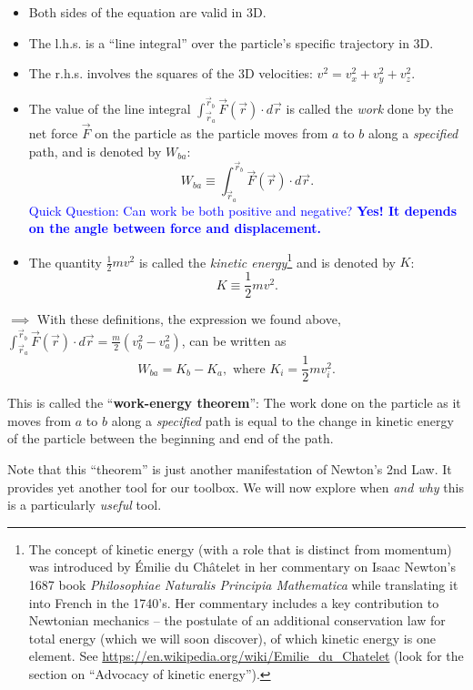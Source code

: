 \documentclass[11pt, letterpaper, openany]{book}
\begin{document}
\begin{itemize}
    \item Both sides of the equation are valid in 3D.
    \item The l.h.s. is a ``line integral'' over the particle's specific trajectory in 3D.
    \item The r.h.s. involves the squares of the 3D velocities: $v^2 = v_x^2 + v_y^2 + v_z^2$.
    \item The value of the line integral $\int_{\vec{r}_a}^{\vec{r}_b} \vec{F}(\vec{r}) \cdot d\vec{r}$ is called the \textit{work} done by the net force $\vec{F}$ on the particle as the particle moves from $a$ to $b$ along a \textit{specified} path, and is denoted by $W_{ba}$:
    \[ W_{ba} \equiv \int_{\vec{r}_a}^{\vec{r}_b} \vec{F}(\vec{r}) \cdot d\vec{r}. \]
    \textcolor{blue}{Quick Question: Can work be both positive and negative? \textbf{Yes! It depends on the angle between force and displacement.}}
    \item The quantity $\frac{1}{2}mv^2$ is called the \textit{kinetic energy}\footnote{The concept of kinetic energy (with a role that is distinct from momentum) was introduced by \'Emilie du Ch\^atelet in her commentary on Isaac Newton's 1687 book \textit{Philosophiae Naturalis Principia Mathematica} while translating it into French in the 1740's. Her commentary includes a key contribution to Newtonian mechanics -- the postulate of an additional conservation law for total energy (which we will soon discover), of which kinetic energy is one element. See \url{https://en.wikipedia.org/wiki/Emilie_du_Chatelet} (look for the section on ``Advocacy of kinetic energy'').} and is denoted by $K$:
    \[ K \equiv \frac{1}{2}mv^2. \]
\end{itemize}

$\implies$ With these definitions, the expression we found above, $\int_{\vec{r}_a}^{\vec{r}_b} \vec{F}(\vec{r}) \cdot d\vec{r} = \frac{m}{2}(v_b^2 - v_a^2)$, can be written as
\[ W_{ba} = K_b - K_a, \text{ where } K_i = \frac{1}{2}mv_i^2. \]

This is called the ``\textbf{work-energy theorem}'': The work done on the particle as it moves from $a$ to $b$ along a \textit{specified} path is equal to the change in kinetic energy of the particle between the beginning and end of the path.

Note that this ``theorem'' is just another manifestation of Newton's 2nd Law. It provides yet another tool for our toolbox. We will now explore when \textit{and why} this is a particularly \textit{useful} tool.
\end{document}
